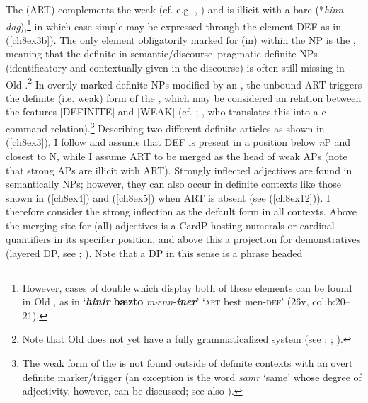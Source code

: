 \documentclass[output=paper,colorlinks,citecolor=brown]{langscibook}
\begin{document}
The   (ART) complements the weak  (cf.
e.g. \citealt{StrohWollin2009}, ) and is illicit
with a bare  (*\emph{hinn dag}),\footnote{However, cases of double
   which display both of these elements can be found in Old
  , as in `\textbf{\textit{hinir}} \textbf{bæzto} \textit{mænn}-\textbf{\textit{iner}}' `\textsc{art} best men-\textsc{def}' (26v,
  col.b:20--21).} in which case simple
 may be expressed through the element DEF as in (\ref{ch8ex3b}). The
only element obligatorily marked for (in) within the NP is
the , meaning that the definite  in
semantic\slash discourse--pragmatic definite NPs (identificatory and
contextually given in the discourse) is often still missing in Old
.\footnote{Note that Old  does not yet have a fully
  grammaticalized  system (see \citealp[27f]{Nygaard05}; \citealp[56, 74]{Faarlund04}; \citealp[225]{CrismaPintzuk2019}).} In overtly marked definite NPs
modified by an , the unbound  ART triggers the definite
(i.e. weak) form of the , which may be considered an 
relation between the features {[}DEFINITE{]} and {[}WEAK{]} (cf. \citealp[118]{Vangsnes1997}; \citealp[54]{Pfaff2015}, who translates this into a c-command
relation).\footnote{The weak form of the  is not found outside
  of definite contexts with an overt definite marker/trigger (an
  exception is the word \emph{samr} `same' whose degree of adjectivity,
  however, can be discussed; see also \citealp[12]{Bech17}).} Describing two
different definite articles as shown in (\ref{ch8ex3}), I follow \citet{Pfaff2019} and
assume that DEF is present in a position below \emph{n}P and closest to N,
while I assume ART to be merged as the head of weak APs (note that
strong APs are illicit with ART). Strongly inflected adjectives are found in semantically  NPs; however, they can also occur in definite contexts like those shown in (\ref{ch8ex4}) and (\ref{ch8ex5}) when ART is absent (see (\ref{ch8ex12})). I therefore consider the strong inflection as the default form in all contexts.
Above the merging site for (all) adjectives is a CardP hosting numerals
or cardinal quantifiers in its specifier position, and above this a
projection for demonstratives (layered DP, see \citealp{Julien2002,Julien2005}; \citealp{Adger2013}). Note that a DP in this sense is a  phrase headed
\end{document}
